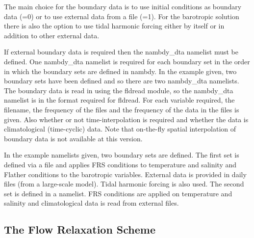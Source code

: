 \documentclass[NEMO_book]{subfiles}
\begin{document}
\mbox{}

The main choice for the boundary data is
to use initial conditions as boundary data (=0) or to
use external data from a file (=1). For the
barotropic solution there is also the option to use tidal
harmonic forcing either by itself or in addition to other external
data. 

If external boundary data is required then the nambdy\_dta namelist
must be defined. One nambdy\_dta namelist is required for each boundary
set in the order in which the boundary sets are defined in nambdy. In
the example given, two boundary sets have been defined and so there
are two nambdy\_dta namelists. The boundary data is read in using the
fldread module, so the nambdy\_dta namelist is in the format required
for fldread. For each variable required, the filename, the frequency
of the files and the frequency of the data in the files is given. Also
whether or not time-interpolation is required and whether the data is
climatological (time-cyclic) data. Note that on-the-fly spatial
interpolation of boundary data is not available at this version. 

In the example namelists given, two boundary sets are defined. The
first set is defined via a file and applies FRS conditions to
temperature and salinity and Flather conditions to the barotropic
variables. External data is provided in daily files (from a
large-scale model). Tidal harmonic forcing is also used. The second
set is defined in a namelist. FRS conditions are applied on
temperature and salinity and climatological data is read from external
files. 

\subsection{The Flow Relaxation Scheme}
\label{BDY_FRS_scheme}
\end{document}
